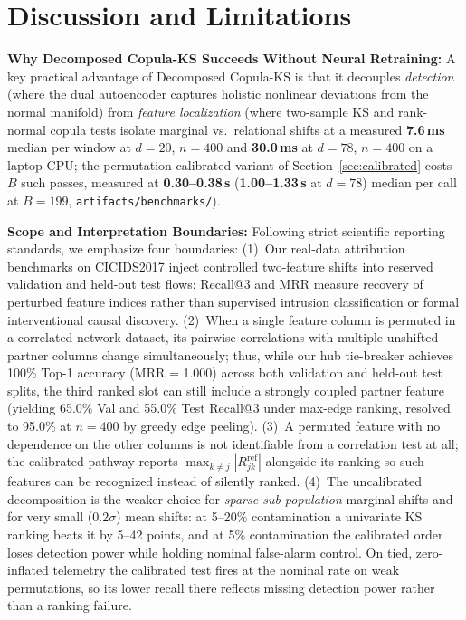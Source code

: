 \documentclass[10pt,conference]{IEEEtran}
\begin{document}
\section{Discussion and Limitations}
\label{sec:limitations}

\textbf{Why Decomposed Copula-KS Succeeds Without Neural Retraining:}
A key practical advantage of Decomposed Copula-KS is that it decouples
\emph{detection} (where the dual autoencoder captures holistic nonlinear
deviations from the normal manifold) from \emph{feature localization} (where
two-sample KS and rank-normal copula tests isolate marginal vs.\
relational shifts at a measured \textbf{7.6\,ms} median per window at
$d = 20$, $n = 400$ and \textbf{30.0\,ms} at $d = 78$, $n = 400$ on a laptop
CPU; the permutation-calibrated variant of Section~\ref{sec:calibrated} costs
$B$ such passes, measured at \textbf{0.30--0.38\,s} (\textbf{1.00--1.33\,s} at
$d = 78$) median per call at $B = 199$, \texttt{artifacts/benchmarks/}).

\textbf{Scope and Interpretation Boundaries:}
Following strict scientific reporting standards, we emphasize four boundaries:
(1)~Our real-data attribution benchmarks on CICIDS2017 inject controlled
two-feature shifts into reserved validation and held-out test flows; Recall@3
and MRR measure recovery of perturbed feature indices rather than supervised
intrusion classification or formal interventional causal discovery.
(2)~When a single feature column is permuted in a correlated network dataset,
its pairwise correlations with multiple unshifted partner columns change
simultaneously; thus, while our hub tie-breaker achieves 100\% Top-1 accuracy
(MRR = 1.000) across both validation and held-out test splits, the third ranked
slot can still include a strongly coupled partner feature (yielding 65.0\% Val
and 55.0\% Test Recall@3 under max-edge ranking, resolved to 95.0\% at $n = 400$
by greedy edge peeling).
(3)~A permuted feature with no dependence on the other columns is not
identifiable from a correlation test at all; the calibrated pathway reports
$\max_{k \ne j}|R^{\mathrm{ref}}_{jk}|$ alongside its ranking so such features can
be recognized instead of silently ranked.
(4)~The uncalibrated decomposition is the weaker choice for \emph{sparse sub-population}
marginal shifts and for very small ($0.2\sigma$) mean shifts: at 5--20\%
contamination a univariate KS ranking beats it by 5--42 points, and at 5\%
contamination the calibrated order loses detection power while holding nominal
false-alarm control. On tied, zero-inflated telemetry the calibrated test fires
at the nominal rate on weak permutations, so its lower recall there reflects
missing detection power rather than a ranking failure.
\end{document}

